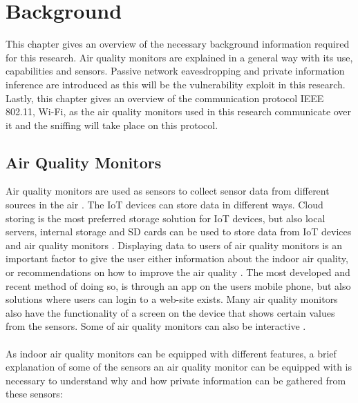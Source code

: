 \chapter{Background}
This chapter gives an overview of the necessary background information required for this research. Air quality monitors are explained in a general way with its use, capabilities and sensors. Passive network eavesdropping and private information inference are introduced as this will be the vulnerability exploit in this research. Lastly, this chapter gives an overview of the communication protocol IEEE 802.11, Wi-Fi, as the air quality monitors used in this research communicate over it and the sniffing will take place on this protocol.

\section{Air Quality Monitors}
Air quality monitors are used as sensors to collect sensor data from different sources in the air \cite{GeneralAirQualityMonitor}. The IoT devices can store data in different ways. Cloud storing is the most preferred storage solution for IoT devices, but also local servers, internal storage and SD cards can be used to store data from IoT devices and air quality monitors \cite{AQMBigSource}. Displaying data to users of air quality monitors is an important factor to give the user either information about the indoor air quality, or recommendations on how to improve the air quality \cite{AQMBigSource}. The most developed and recent method of doing so, is through an app on the users mobile phone, but also solutions where users can login to a web-site exists. Many air quality monitors also have the functionality of a screen on the device that shows certain values from the sensors. Some of air quality monitors can also be interactive \cite{AQMBigSource}.
\\\\
As indoor air quality monitors can be equipped with different features, a brief explanation of some of the sensors an air quality monitor can be equipped with is necessary to understand why and how private information can be gathered from these sensors:
